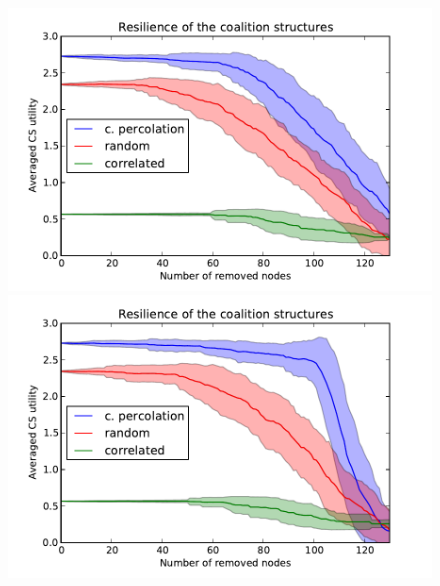 \documentclass[xcolor=dvipsnames]{beamer}
\begin{document}
\begin{frame}
	\begin{figure}
		\includegraphics[scale=.35]{resilience_without.pdf}
		\includegraphics[scale=.35]{resilience_with.pdf}
	\end{figure}

\end{frame}



%
%
\end{document}
